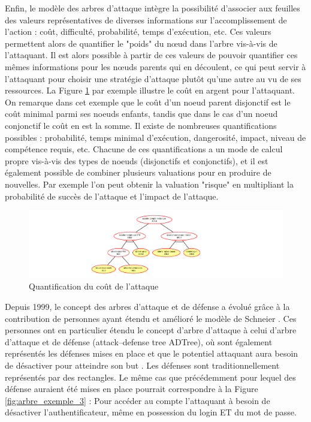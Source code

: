         Enfin, le modèle des arbres d'attaque intègre la possibilité d'associer aux feuilles des valeurs représentatives de diverses informations sur l'accomplissement de l'action : coût, difficulté, probabilité, temps d'exécution, etc. Ces valeurs permettent alors de quantifier le "poids" du nœud dans l'arbre vis-à-vis de l'attaquant. Il est alors possible à partir de ces valeurs de pouvoir quantifier ces mêmes informations pour les nœuds parents qui en découlent, ce qui peut servir à l'attaquant pour choisir une stratégie d'attaque plutôt qu'une autre au vu de ses ressources. La Figure \ref{fig:arbre_exemple_2} par exemple illustre le coût en argent pour l'attaquant. On remarque dans cet exemple que le coût d'un noeud parent disjonctif est le coût minimal parmi ses noeuds enfants, tandis que dans le cas d'un noeud conjonctif le coût en est la somme. Il existe de nombreuses quantifications possibles : probabilité, temps minimal d'exécution, dangerosité, impact, niveau de compétence requis, etc. Chacune de ces quantifications a un mode de calcul propre vis-à-vis des types de noeuds (disjonctifs et conjonctifs), et il est également possible de combiner plusieurs valuations pour en produire de nouvelles. Par exemple l'on peut obtenir la valuation "risque" en multipliant la probabilité de succès de l'attaque et l'impact de l'attaque.

        \begin{figure}[htbp]
        \centering
        \includegraphics[width=\textwidth]{figure/quantification.pdf}%
        \caption{Quantification du coût de l'attaque}
        \label{fig:arbre_exemple_2}
        \end{figure}

		Depuis 1999, le concept des arbres d'attaque et de défense a évolué grâce à la contribution de personnes ayant étendu et amélioré le modèle de Schneier \cite{ADTreeKordy}. Ces personnes ont en particulier étendu le concept d'arbre d'attaque à celui d’arbre d’attaque et de défense (attack–defense tree ADTree), où sont également représentés les défenses mises en place et que le potentiel attaquant aura besoin de désactiver pour atteindre son but \cite{ADTreeOxford}. Les défenses sont traditionnellement représentés par des rectangles. Le même cas que précédemment pour lequel des défense auraient été mises en place pourrait correspondre à la Figure \ref{fig:arbre_exemple_3} : Pour accéder au compte l'attaquant à besoin de désactiver l'authentificateur, même en possession du login ET du mot de passe.

